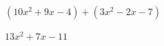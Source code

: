 
\question $(10x^2 + 9x - 4) + (3x^2 - 2x - 7)$

  \begin{solutionorlines}[2cm]
    $13x^2 + 7x - 11$
  \end{solutionorlines}
